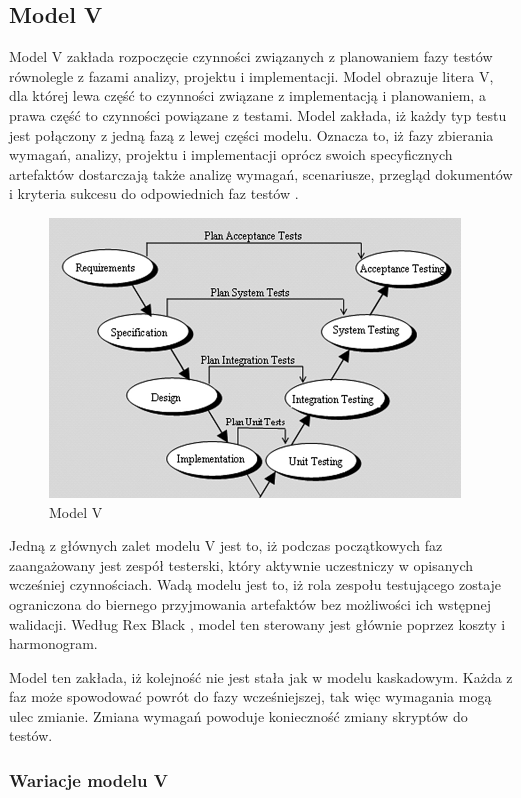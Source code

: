 \subsection{Model V}


Model V zakłada rozpoczęcie czynności związanych z planowaniem fazy testów równolegle z fazami analizy, projektu i implementacji. Model obrazuje litera V, dla której lewa część to czynności związane z implementacją i planowaniem, a prawa część to czynności powiązane z testami. Model zakłada, iż każdy typ testu jest połączony z jedną fazą z lewej części modelu. Oznacza to, iż fazy zbierania wymagań, analizy, projektu i implementacji oprócz swoich specyficznych artefaktów dostarczają także analizę wymagań, scenariusze, przegląd dokumentów i kryteria sukcesu do odpowiednich faz testów \cite{otss}.

\begin{figure}[h]
\centerline{\includegraphics[scale=0.8]{img/vmodel.png}}
\caption{Model V \cite{otss}}
\label{fig:vmodel}
\end{figure}

Jedną z głównych zalet modelu V jest to, iż podczas początkowych faz zaangażowany jest zespół testerski, który aktywnie uczestniczy w opisanych wcześniej czynnościach. Wadą modelu jest to, iż rola zespołu testującego zostaje ograniczona do biernego przyjmowania artefaktów bez możliwości ich wstępnej walidacji.  Według Rex Black \cite{Fund}, model ten sterowany jest głównie poprzez koszty i harmonogram.

Model ten zakłada, iż kolejność nie jest stała jak w modelu kaskadowym. Każda z faz może spowodować powrót do fazy wcześniejszej, tak więc wymagania mogą ulec zmianie. Zmiana wymagań powoduje konieczność zmiany skryptów do testów.

\subsubsection{Wariacje modelu V}


